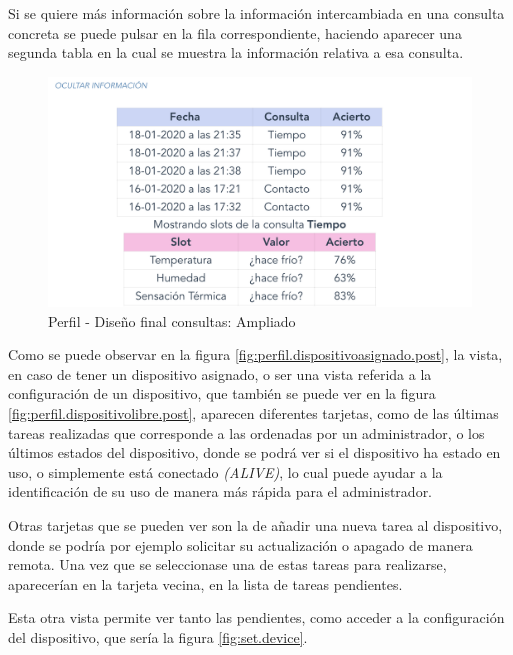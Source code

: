 \begin{enumerate}
    Si se quiere más información sobre la información intercambiada en una consulta concreta se puede pulsar en la fila correspondiente, haciendo aparecer una segunda tabla en la cual se muestra la información relativa a esa consulta.
    
    \begin{figure}[H]   
        \centering
        \includegraphics[width=12cm]{./img/web2/profile.stats.opened.png}
        \caption{Perfil - Diseño final consultas: Ampliado}
        \label{fig:perfil.consult.plus}
    \end{figure}
\end{enumerate}

    Como se puede observar en la figura \ref{fig:perfil.dispositivoasignado.post}, la vista, en caso de tener un dispositivo asignado, o ser una vista referida a la configuración de un dispositivo, que también se puede ver en la figura \ref{fig:perfil.dispositivolibre.post}, aparecen diferentes tarjetas, como de las últimas tareas realizadas que corresponde a las ordenadas por un administrador, o los últimos estados del dispositivo, donde se podrá ver si el dispositivo ha estado en uso, o simplemente está conectado \textit{(ALIVE)}, lo cual puede ayudar a la identificación de su uso de manera más rápida para el administrador.
    
    Otras tarjetas que se pueden ver son la de añadir una nueva tarea al dispositivo, donde se podría por ejemplo solicitar su actualización o apagado de manera remota. Una vez que se seleccionase una de estas tareas para realizarse, aparecerían en la tarjeta vecina, en la lista de tareas pendientes.
    
    Esta otra vista permite ver tanto las pendientes, como acceder a la configuración del dispositivo, que sería la figura \ref{fig:set.device}.